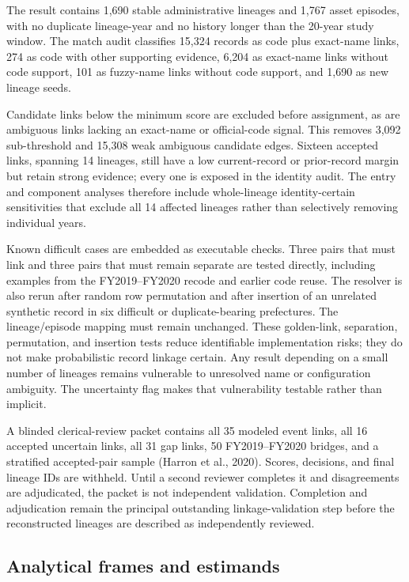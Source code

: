 \documentclass[12pt,a4paper]{article}
\begin{document}
The result contains 1,690 stable administrative lineages and 1,767 asset
episodes, with no duplicate lineage-year and no history longer than the 20-year
study window. The match audit classifies 15,324 records as code plus exact-name
links, 274 as code with other supporting evidence, 6,204 as exact-name links
without code support, 101 as fuzzy-name links without code support, and 1,690 as
new lineage seeds.

Candidate links below the minimum score are excluded before assignment, as are
ambiguous links lacking an exact-name or official-code signal. This removes
3,092 sub-threshold and 15,308 weak ambiguous candidate edges. Sixteen accepted
links, spanning 14 lineages, still have a low current-record or prior-record
margin but retain strong evidence; every one is exposed in the identity audit.
The entry and component analyses therefore include whole-lineage
identity-certain sensitivities that exclude all 14 affected lineages rather
than selectively removing individual years.

Known difficult cases are embedded as executable checks. Three pairs that must
link and three pairs that must remain separate are tested directly, including
examples from the FY2019--FY2020 recode and earlier code reuse. The resolver is
also rerun after random row permutation and after insertion of an unrelated
synthetic record in six difficult or duplicate-bearing prefectures. The
lineage/episode mapping must remain unchanged. These golden-link, separation,
permutation, and insertion tests reduce identifiable implementation risks; they
do not make probabilistic record linkage certain. Any result depending on a
small number of lineages remains vulnerable to unresolved name or configuration
ambiguity. The uncertainty flag makes that vulnerability testable rather than
implicit.

A blinded clerical-review packet contains all 35 modeled event links, all 16
accepted uncertain links, all 31 gap links, 50 FY2019--FY2020 bridges, and a
stratified accepted-pair sample (Harron et al., 2020). Scores, decisions, and
final lineage IDs are withheld. Until a second reviewer completes it and
disagreements are adjudicated, the packet is not independent validation.
Completion and adjudication remain the principal outstanding
linkage-validation step before the reconstructed lineages are described as
independently reviewed.

\subsection{Analytical frames and estimands}
\end{document}
